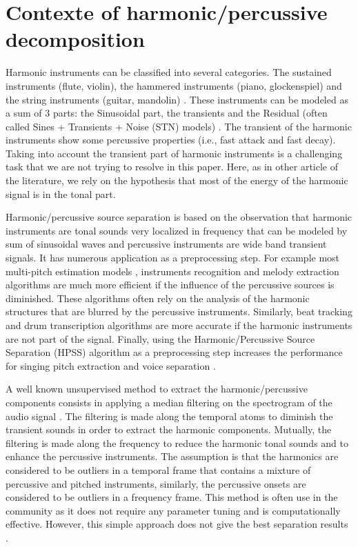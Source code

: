\documentclass[journal]{IEEEtran}
\begin{document}
\section{Contexte of harmonic/percussive decomposition}\label{sec:Background}


Harmonic instruments can be classified into several categories. The sustained instruments (flute, violin), the hammered instruments (piano, glockenspiel) and the string instruments (guitar, mandolin) \cite{peeters2003automatic,peeters2003hierarchical}. These instruments can be modeled as a sum of $3$ parts: the Sinusoidal part, the transients and the Residual (often called Sines + Transients + Noise (STN) models) \cite{daudet2006review}. The transient of the harmonic instruments show some percussive properties (i.e., fast attack and fast decay). Taking into account the transient part of harmonic instruments is a challenging task that we are not trying to resolve in this paper. Here, as in other article of the literature, we rely on the hypothesis that most of the energy of the harmonic signal is in the tonal part. 

Harmonic/percussive source separation is based on the observation that harmonic instruments are tonal sounds very localized in frequency that can be modeled by sum of sinusoidal waves and percussive instruments are wide band transient signals. It has numerous application as a preprocessing step. For example most multi-pitch estimation models \cite{klapuri2008multipitch}, instruments recognition and melody extraction \cite{salamon2012melody} algorithms are much more efficient if the influence of the percussive sources is diminished. These algorithms often rely on the analysis of the harmonic structures that are blurred by the percussive instruments. Similarly, beat tracking \cite{ellis2007beat} and drum transcription algorithms \cite{paulus2005drum} are more accurate if the harmonic instruments are not part of the signal. Finally, using the Harmonic/Percussive Source Separation (HPSS) algorithm \cite{fitzgerald2010harmonic} as a preprocessing step increases the performance for singing pitch extraction and voice separation \cite{hsu2012tandem}.

A well known unsupervised method to extract the harmonic/percussive components consists in applying a median filtering on the spectrogram of the audio signal \cite{fitzgerald2010harmonic,ono2008separation}. The filtering is made along the temporal atoms to diminish the transient sounds in order to extract the harmonic components. Mutually, the filtering is made along the frequency to reduce the harmonic tonal sounds and to enhance the percussive instruments. The assumption is that the harmonics are considered to be outliers in a temporal frame that contains a mixture of percussive and pitched instruments, similarly, the percussive onsets are considered to be outliers in a frequency frame. This method is often use in the community as it does not require any parameter tuning and is computationally effective. However, this simple approach does not give the best separation results \cite{canadas2014percussive}.
\end{document}
